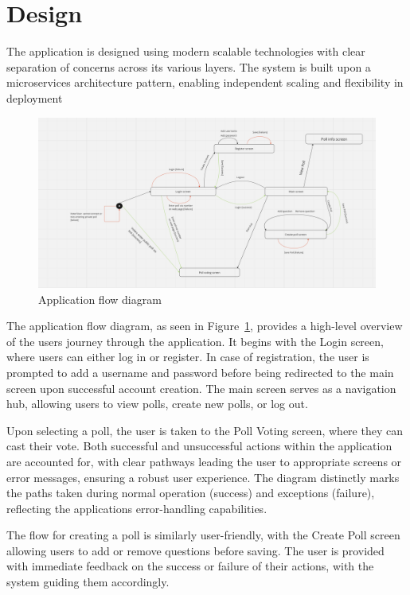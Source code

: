 \section{Design}
\label{sec:design}

The application is designed using modern scalable technologies with clear separation of concerns across its various layers. 
The system is built upon a microservices architecture pattern, enabling independent scaling and flexibility in deployment


\begin{figure}[!htbp]
\centering
\includegraphics[width=\linewidth]{figs/ApplicationFlowDiagram.png}
\caption{Application flow diagram}
\label{fig:appflow}
\end{figure}

The application flow diagram, as seen in Figure~\ref{fig:appflow}, provides a high-level overview of the users journey through the application. It begins with the Login screen, where users can either log in or register. In case of registration, the user is prompted to add a username and password before being redirected to the main screen upon successful account creation. The main screen serves as a navigation hub, allowing users to view polls, create new polls, or log out.

Upon selecting a poll, the user is taken to the Poll Voting screen, where they can cast their vote. Both successful and unsuccessful actions within the application are accounted for, with clear pathways leading the user to appropriate screens or error messages, ensuring a robust user experience. The diagram distinctly marks the paths taken during normal operation (success) and exceptions (failure), reflecting the applications error-handling capabilities.

The flow for creating a poll is similarly user-friendly, with the Create Poll screen allowing users to add or remove questions before saving. The user is provided with immediate feedback on the success or failure of their actions, with the system guiding them accordingly.


